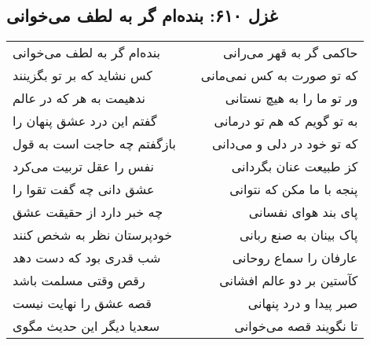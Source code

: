 \begin{center}
\section*{غزل ۶۱۰: بنده‌ام گر به لطف می‌خوانی}
\label{sec:610}
\begin{longtable}{l p{0.5cm} r}
بنده‌ام گر به لطف می‌خوانی
&&
حاکمی گر به قهر می‌رانی
\\
کس نشاید که بر تو بگزینند
&&
که تو صورت به کس نمی‌مانی
\\
ندهیمت به هر که در عالم
&&
ور تو ما را به هیچ نستانی
\\
گفتم این درد عشق پنهان را
&&
به تو گویم که هم تو درمانی
\\
بازگفتم چه حاجت است به قول
&&
که تو خود در دلی و می‌دانی
\\
نفس را عقل تربیت می‌کرد
&&
کز طبیعت عنان بگردانی
\\
عشق دانی چه گفت تقوا را
&&
پنجه با ما مکن که نتوانی
\\
چه خبر دارد از حقیقت عشق
&&
پای بند هوای نفسانی
\\
خودپرستان نظر به شخص کنند
&&
پاک بینان به صنع ربانی
\\
شب قدری بود که دست دهد
&&
عارفان را سماع روحانی
\\
رقص وقتی مسلمت باشد
&&
کآستین بر دو عالم افشانی
\\
قصه عشق را نهایت نیست
&&
صبر پیدا و درد پنهانی
\\
سعدیا دیگر این حدیث مگوی
&&
تا نگویند قصه می‌خوانی
\\
\end{longtable}
\end{center}

